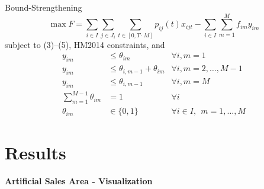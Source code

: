 \documentclass[xcolor=dvipsnames,aspectratio=169, handout, mathserif]{beamer}
\begin{document}
\begin{frame}{Bound-Strengthening}
    \begin{equation}
        \max F = \sum_{i \in I} \sum_{j \in J_i} \sum_{t \in [0,T \cdot M]} p_{ij}(t)  x_{ijt} - \sum_{i \in I} \sum_{m=1}^M f_{im} y_{im}
    \end{equation}
    subject to (3)--(5), HM2014 constraints, and
    \begin{align}
        y_{im} &\leq \theta_{im} & \forall i, m = 1\\
        y_{im} &\leq \theta_{i,m-1} + \theta_{im}  & \forall i, m = 2,\dots,M-1 \\
        y_{im} &\leq \theta_{i,m-1} & \forall i, m = M \\
        \sum_{m=1}^{M-1} \theta_{im} &= 1 & \forall i \\
        \theta_{im} &\in \{0,1\} & \forall i \in I, \ \ m = 1,\dots,M
    \end{align}
\end{frame}



\section{Results}

\begin{frame}{\textbf{Artificial Sales Area - Visualization}}
\begin{center}
    
\end{center}
\end{frame}
\end{document}

